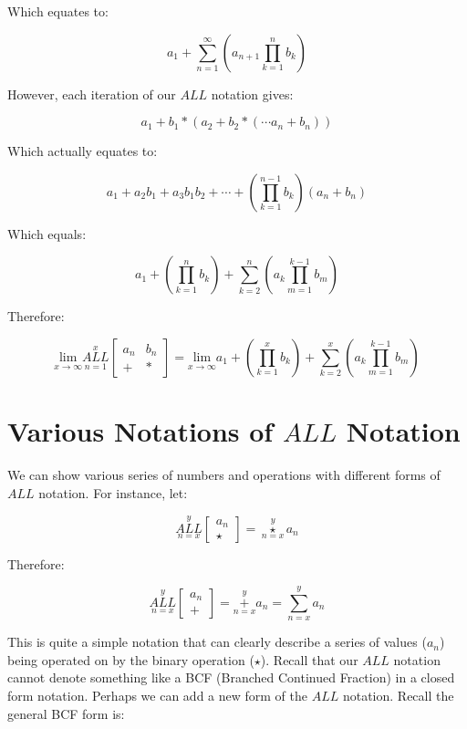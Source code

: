 \documentclass{article}
\begin{document}
Which equates to:

$$ a_1+\underset{n=1}{\overset{\infty}{\sum}} (a_{n+1} \underset{k=1}{\overset{n}{\prod}} b_{k}) $$

However, each iteration of our $ALL$ notation gives:

$$a_1+b_1*(a_2+b_2*(\cdots a_n+b_n))$$

Which actually equates to:

$$a_1+a_2b_1+a_3b_1b_2+\cdots +(\underset{k=1}{\overset{n-1}{\prod}} b_{k})(a_n+b_n)$$

Which equals:

$$a_1 + (\underset{k=1}{\overset{n}{\prod}} b_{k})+\underset{k=2}{\overset{n}{\sum}} (a_{k} \underset{m=1}{\overset{k-1}{\prod}} b_{m})$$

Therefore:

$$\underset{x\xrightarrow{}\infty}{\text{lim}}\underset{n=1}{\overset{x}{ALL}} \begin{bmatrix}
a_n & b_n \\
+ & *
\end{bmatrix}=\underset{x\xrightarrow{}\infty}{\text{lim}} a_1 + (\underset{k=1}{\overset{x}{\prod}} b_{k})+\underset{k=2}{\overset{x}{\sum}} (a_{k} \underset{m=1}{\overset{k-1}{\prod}} b_{m})$$

\section{Various Notations of $ALL$ Notation}

We can show various series of numbers and operations with different forms of $ALL$ notation. For instance, let:

$$\underset{n=x}{\overset{y}{ALL}}
\begin{bmatrix}
a_n \\
\star
\end{bmatrix} = \underset{n=x}{\overset{y}{\star}}a_n$$

Therefore:

$$\underset{n=x}{\overset{y}{ALL}}
\begin{bmatrix}
a_n \\
+
\end{bmatrix} = \underset{n=x}{\overset{y}{+}} a_n = \underset{n=x}{\overset{y}{\sum}} a_n$$

This is quite a simple notation that can clearly describe a series of values ($a_n$) being operated on by the binary operation ($\star$). Recall that our $ALL$ notation cannot denote something like a BCF (Branched Continued Fraction) in a closed form notation. Perhaps we can add a new form of the $ALL$ notation. Recall the general BCF form is:
\end{document}
